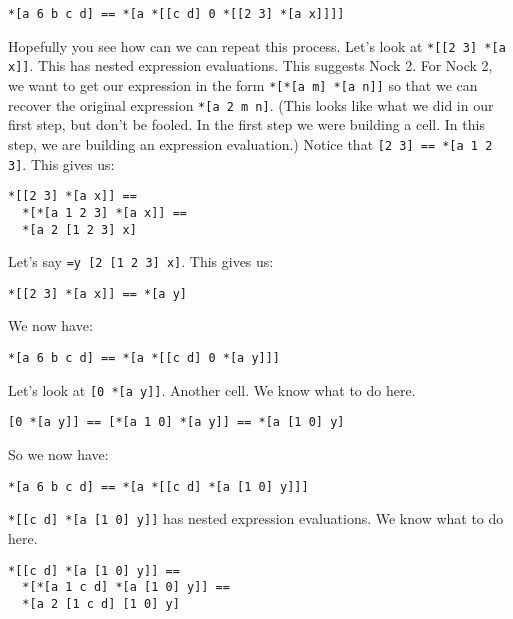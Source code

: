 \documentclass[twoside]{article}
\begin{document}
\begin{lstlisting}[style=listingblock]
*[a 6 b c d] == *[a *[[c d] 0 *[[2 3] *[a x]]]]
\end{lstlisting}

\noindent
Hopefully you see how can we can repeat this process. Let's look at \lstinline[style=inlinecode]{*[[2 3] *[a x]]}. This has nested expression evaluations. This suggests Nock 2. For Nock 2, we want to get our expression in the form \lstinline[style=inlinecode]{*[*[a m] *[a n]]} so that we can recover the original expression \lstinline[style=inlinecode]{*[a 2 m n]}. (This looks like what we did in our first step, but don't be fooled. In the first step we were building a cell. In this step, we are building an expression evaluation.) Notice that \lstinline[style=inlinecode]{[2 3] == *[a 1 2 3]}. This gives us:

\begin{lstlisting}[style=listingblock]
*[[2 3] *[a x]] ==
  *[*[a 1 2 3] *[a x]] ==
  *[a 2 [1 2 3] x]
\end{lstlisting}

Let's say \lstinline[style=inlinecode]{=y [2 [1 2 3] x]}. This gives us:

\begin{lstlisting}[style=listingblock]
*[[2 3] *[a x]] == *[a y]
\end{lstlisting}

\noindent
We now have:

\begin{lstlisting}[style=listingcode]
*[a 6 b c d] == *[a *[[c d] 0 *[a y]]]
\end{lstlisting}

Let's look at \lstinline[style=inlinecode]{[0 *[a y]]}. Another cell. We know what to do here.

\begin{lstlisting}[style=listingblock]
[0 *[a y]] == [*[a 1 0] *[a y]] == *[a [1 0] y]
\end{lstlisting}

So we now have:

\begin{lstlisting}[style=listingblock]
*[a 6 b c d] == *[a *[[c d] *[a [1 0] y]]]
\end{lstlisting}

\noindent
\lstinline[style=inlinecode]{*[[c d] *[a [1 0] y]]} has nested expression evaluations. We know what to do here.

\begin{lstlisting}[style=listingblock]
*[[c d] *[a [1 0] y]] ==
  *[*[a 1 c d] *[a [1 0] y]] ==
  *[a 2 [1 c d] [1 0] y]
\end{lstlisting}
\end{document}
